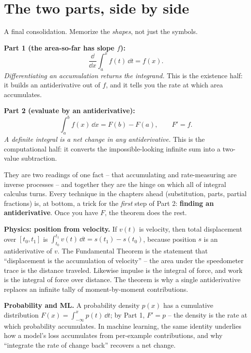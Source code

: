 \section{The two parts, side by side}

\begin{focusbox}
A final consolidation. Memorize the \emph{shapes}, not just the symbols.

\textbf{Part 1 (the area-so-far has slope $f$):}
\[
  \frac{\dd}{\dd x}\int_a^x f(t)\,\dd t = f(x).
\]
\emph{Differentiating an accumulation returns the integrand.} This is the
existence half: it builds an antiderivative out of $f$, and it tells you the rate
at which area accumulates.

\textbf{Part 2 (evaluate by an antiderivative):}
\[
  \int_a^b f(x)\,\dd x = F(b)-F(a), \qquad F'=f.
\]
\emph{A definite integral is a net change in any antiderivative.} This is the
computational half: it converts the impossible-looking infinite sum into a
two-value subtraction.

They are two readings of one fact -- that accumulating and rate-measuring are
inverse processes -- and together they are the hinge on which all of integral
calculus turns. Every technique in the chapters ahead (substitution, parts,
partial fractions) is, at bottom, a trick for the \emph{first} step of Part 2:
\textbf{finding an antiderivative}. Once you have $F$, the theorem does the rest.
\end{focusbox}

\begin{applicationbox}
\textbf{Physics: position from velocity.} If $v(t)$ is velocity, then total
displacement over $[t_0,t_1]$ is $\int_{t_0}^{t_1} v(t)\,\dd t = s(t_1)-s(t_0)$,
because position $s$ is an antiderivative of $v$. The Fundamental Theorem is the
statement that ``displacement is the accumulation of velocity'' -- the area under
the speedometer trace is the distance traveled. Likewise impulse is the integral
of force, and work is the integral of force over distance. The theorem is why a
single antiderivative replaces an infinite tally of moment-by-moment
contributions.

\textbf{Probability and ML.} A probability density $p(x)$ has a cumulative
distribution $F(x)=\int_{-\infty}^x p(t)\,\dd t$; by Part 1, $F'=p$ -- the density
is the rate at which probability accumulates. In machine learning, the same
identity underlies how a model's loss accumulates from per-example contributions,
and why ``integrate the rate of change back'' recovers a net change.
\end{applicationbox}

